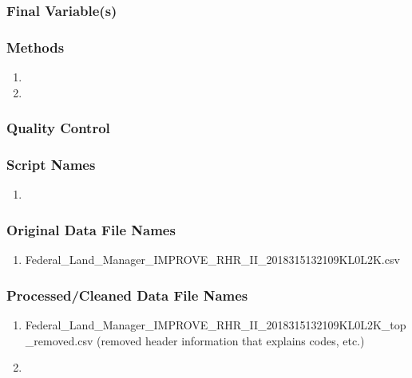 \subsubsection*{Final Variable(s)}

\subsubsection*{Methods}

\begin{enumerate}
\item 
\item
\end{enumerate}

\subsubsection*{Quality Control}

\subsubsection*{Script Names}

\begin{enumerate}
\item 
\end{enumerate}

\subsubsection*{Original Data File Names}

\begin{enumerate}
\item Federal\_Land\_Manager\_IMPROVE\_RHR\_II\_2018315132109KL0L2K.csv
\end{enumerate}

\subsubsection*{Processed/Cleaned Data File Names}

\begin{enumerate}
\item Federal\_Land\_Manager\_IMPROVE\_RHR\_II\_2018315132109KL0L2K\_top\_removed.csv (removed header information that explains codes, etc.)
\item
\end{enumerate}